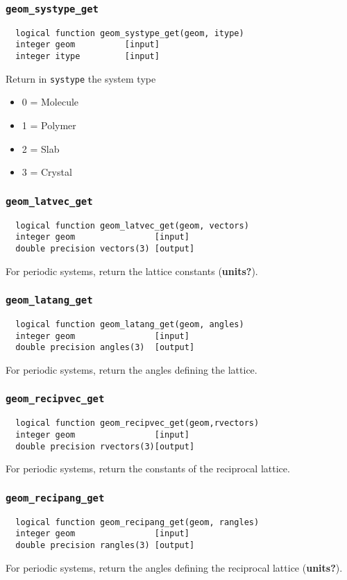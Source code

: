 \subsubsection{{\tt geom\_systype\_get}}
\begin{verbatim}
  logical function geom_systype_get(geom, itype)
  integer geom          [input]
  integer itype         [input]
\end{verbatim}
Return in {\tt systype} the system type
\begin{itemize}
\item 0 = Molecule
\item 1 = Polymer
\item 2 = Slab
\item 3 = Crystal
\end{itemize}

\subsubsection{{\tt geom\_latvec\_get}}
\begin{verbatim}
  logical function geom_latvec_get(geom, vectors)
  integer geom                [input]
  double precision vectors(3) [output]
\end{verbatim}
For periodic systems, return the lattice constants ({\bf units?}).

\subsubsection{{\tt geom\_latang\_get}}
\begin{verbatim}
  logical function geom_latang_get(geom, angles)
  integer geom                [input]
  double precision angles(3)  [output]
\end{verbatim}
For periodic systems, return the angles defining the lattice.

\subsubsection{{\tt geom\_recipvec\_get}}
\begin{verbatim}
  logical function geom_recipvec_get(geom,rvectors)
  integer geom                [input]
  double precision rvectors(3)[output]
\end{verbatim}
For periodic systems, return the constants of the reciprocal lattice.

\subsubsection{{\tt geom\_recipang\_get}}
\begin{verbatim}
  logical function geom_recipang_get(geom, rangles)
  integer geom                [input]
  double precision rangles(3) [output]
\end{verbatim}
For periodic systems, return the angles defining the reciprocal
lattice ({\bf units?}).

